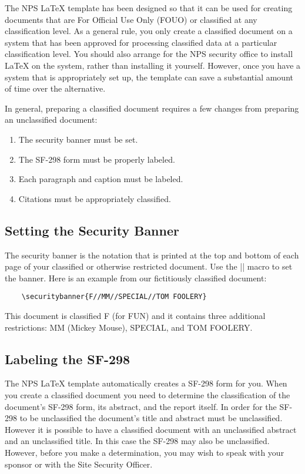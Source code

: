 The NPS \LaTeX{} template has been designed so that it can be used
for creating documents that are For Official Use Only (FOUO) or
classified at any classification level. As a general rule, you only
create a classified document on a system that has been approved for
processing classified data at a particular classification level. You
should also arrange for the NPS security office to install \LaTeX{} on
the system, rather than installing it yourself. However, once you have
a system that is appropriately set up, the template can save a
substantial amount of time over the alternative.

In general, preparing a classified document requires a few
changes from preparing an unclassified document:

\begin{enumerate}
\item The security banner must be set.
\item The SF-298 form must be properly labeled.
\item Each paragraph and caption must be labeled.
\item Citations must be appropriately classified.
\end{enumerate}

\subsection{Setting the Security Banner}

The security banner is the notation that is printed at the top and
bottom of each page of your classified or otherwise restricted
document. Use the |\securitybanner{}| macro to set the banner. Here is
an example from our fictitiously classified document:

\begin{Verbatim}
    \securitybanner{F//MM//SPECIAL//TOM FOOLERY}
\end{Verbatim}

This document is classified F (for FUN) and it contains three
additional restrictions: MM (Mickey Mouse), SPECIAL, and TOM FOOLERY.  

\subsection{Labeling the SF-298}

The NPS \LaTeX{} template automatically creates a SF-298 form for
you. When you create a classified document you need to determine the
classification of the document's SF-298 form, its abstract, and the
report itself. In order for the SF-298 to be unclassified the
document's title and abstract must be unclassified. However it is
possible to have a classified document with an unclassified abstract
and an unclassified title. In this case the SF-298 may also be
unclassified. However, before you make a determination, you may wish
to speak with your sponsor or with the Site Security Officer. 

